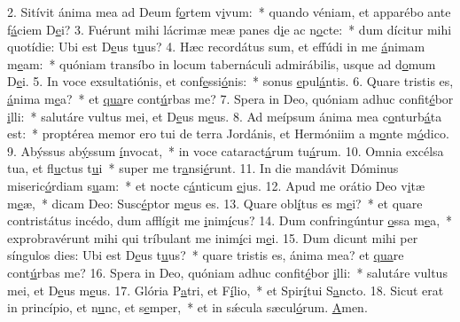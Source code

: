 2. Sitívit ánima mea ad Deum f\uline{o}rtem v\uline{i}vum:~* quando véniam, et apparébo ante f\uline{á}ciem D\uline{e}i?
3. Fuérunt mihi lácrimæ meæ panes d\uline{i}e ac n\uline{o}cte:~* dum dícitur mihi quotídie: Ubi est D\uline{e}us t\uline{u}us?
4. Hæc recordátus sum, et effúdi in me \uline{á}nimam m\uline{e}am:~* quóniam transíbo in locum tabernáculi admirábilis, usque ad d\uline{o}mum D\uline{e}i.
5. In voce exsultatiónis, et conf\uline{e}ssi\uline{ó}nis:~* sonus \uline{e}pul\uline{á}ntis.
6. Quare tristis es, \uline{á}nima m\uline{e}a?~* et \uline{qua}re cont\uline{ú}rbas me?
7. Spera in Deo, quóniam adhuc confit\uline{é}bor \uline{i}lli:~* salutáre vultus mei, et D\uline{e}us m\uline{e}us.
8. Ad meípsum ánima mea c\uline{o}nturb\uline{á}ta est:~* proptérea memor ero tui de terra Jordánis, et Hermóniim a m\uline{o}nte m\uline{ó}dico.
9. Abýssus ab\uline{ý}ssum \uline{í}nvocat,~* in voce cataract\uline{á}rum tu\uline{á}rum.
10. Omnia excélsa tua, et fl\uline{u}ctus t\uline{u}i~* super me tr\uline{a}nsi\uline{é}runt.
11. In die mandávit Dóminus miseric\uline{ó}rdiam s\uline{u}am:~* et nocte c\uline{á}nticum \uline{e}jus.
12. Apud me orátio Deo v\uline{i}tæ m\uline{e}æ,~* dicam Deo: Susc\uline{é}ptor m\uline{e}us es.
13. Quare obl\uline{í}tus es m\uline{e}i?~* et quare contristátus incédo, dum afflígit me \uline{i}nim\uline{í}cus?
14. Dum confringúntur \uline{o}ssa m\uline{e}a,~* exprobravérunt mihi qui tríbulant me inim\uline{í}ci m\uline{e}i.
15. Dum dicunt mihi per síngulos dies: Ubi est D\uline{e}us t\uline{u}us?~* quare tristis es, ánima mea? et \uline{qua}re cont\uline{ú}rbas me?
16. Spera in Deo, quóniam adhuc confit\uline{é}bor \uline{i}lli:~* salutáre vultus mei, et D\uline{e}us m\uline{e}us.
17. Glória P\uline{a}tri, et F\uline{í}lio,~* et Spir\uline{í}tui S\uline{a}ncto.
18. Sicut erat in princípio, et n\uline{u}nc, et s\uline{e}mper,~* et in sǽcula sæcul\uline{ó}rum. \uline{A}men.
